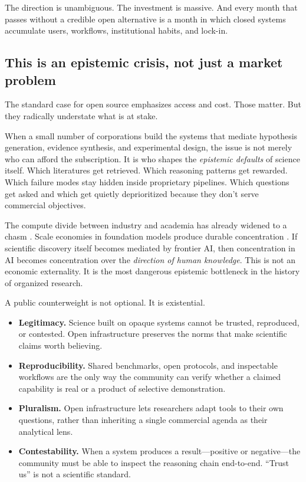 \documentclass[11pt]{article}
\begin{document}
The direction is unambiguous. The investment is massive. And every month that passes without a credible open alternative is a month in which closed systems accumulate users, workflows, institutional habits, and lock-in.

\subsection{This is an epistemic crisis, not just a market problem}

The standard case for open source emphasizes access and cost. Those matter. But they radically understate what is at stake.

When a small number of corporations build the systems that mediate hypothesis generation, evidence synthesis, and experimental design, the issue is not merely who can afford the subscription. It is who shapes the \emph{epistemic defaults} of science itself. Which literatures get retrieved. Which reasoning patterns get rewarded. Which failure modes stay hidden inside proprietary pipelines. Which questions get asked and which get quietly deprioritized because they don't serve commercial objectives.

The compute divide between industry and academia has already widened to a chasm \citep{besiroglu2024computedivide}. Scale economies in foundation models produce durable concentration \citep{korinek2024concentrating}. If scientific discovery itself becomes mediated by frontier AI, then concentration in AI becomes concentration over the \emph{direction of human knowledge}. This is not an economic externality. It is the most dangerous epistemic bottleneck in the history of organized research.

A public counterweight is not optional. It is existential.

\begin{itemize}
  \item \textbf{Legitimacy.} Science built on opaque systems cannot be trusted, reproduced, or contested. Open infrastructure preserves the norms that make scientific claims worth believing.
  \item \textbf{Reproducibility.} Shared benchmarks, open protocols, and inspectable workflows are the only way the community can verify whether a claimed capability is real or a product of selective demonstration.
  \item \textbf{Pluralism.} Open infrastructure lets researchers adapt tools to their own questions, rather than inheriting a single commercial agenda as their analytical lens.
  \item \textbf{Contestability.} When a system produces a result---positive or negative---the community must be able to inspect the reasoning chain end-to-end. ``Trust us'' is not a scientific standard.
\end{itemize}
\end{document}
